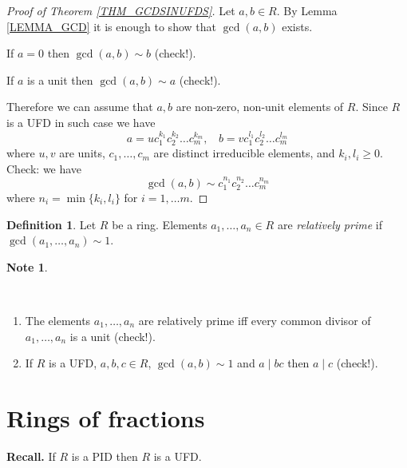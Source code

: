 \documentclass[12pt, letterpaper, oneside]{article}
\theoremstyle{plain}
\theoremstyle{definition}
\newtheorem{definition}[theorem]{Definition}
\newtheorem{note}[theorem]{Note}
\newcommand{\benu}{\begin{enumerate}}
\newcommand{\eenu}{\end{enumerate}}
\newcommand{\vs}{\vskip 5mm}
\begin{document}
 \begin{proof}[Proof of Theorem \ref{THM_GCDSINUFDS}]
Let $a, b\in R$. By Lemma  \ref{LEMMA_GCD} it is enough to show that $\gcd(a, b)$ exists.
 
 If $a= 0$ then $\gcd(a, b)\sim b$ (check!).  
 
 If $a$ is a unit then $\gcd(a, b) \sim a$ (check!).
  
 Therefore we can assume that  $a, b$ are non-zero, non-unit elements of $R$. 
 Since $R$ is a UFD in such case we have 
 $$a = uc_{1}^{k_{1}}c_{2}^{k_{2}}{\dots}c^{k_{m}}_{m}, \ \ \  \  
 b = vc_{1}^{l_{1}}c_{2}^{l_{2}}{\dots}c^{l_{m}}_{m}$$
 where $u, v$ are units, $c_{1}, \dots, c_{m}$ are distinct irreducible elements,  
 and $k_{i}, l_{i}\geq 0$. Check: we have
 $$\gcd(a, b) \sim c_{1}^{n_{1}}c_{2}^{n_{2}}{\dots}c_{m}^{n_{m}}$$
 where $n_{i} = \min\{k_{i}, l_{i}\}$ for $i=1, \dots m$. 
 \end{proof}
 
 
\vs\vs

\begin{definition}
Let $R$ be a ring. Elements $a_{1}, \dots, a_{n}\in R$ are \emph{relatively prime} if 
$\gcd(a_{1}, \dots, a_{n})\sim 1$.
\end{definition} 
 

 \vs\vs
 
 
 \begin{note}\ 
 \label{NOTE_RELPRIMES}
 
 \vskip -13mm
 
 \  
\benu
\item The elements $a_{1}, \dots, a_{n}$ are relatively prime iff every common divisor of 
 $a_{1}, \dots, a_{n}$ is a unit (check!). 
 \item If $R$ is a UFD,  $a, b, c\in R$, $\gcd(a, b)\sim  1$ and $a\mid bc$ then $a\mid c$
 (check!).
\eenu

 \end{note}
 
 





\newpage
\section{Rings of fractions}
\label{SEC_RINGSOFFRACTIONS}


\textbf{Recall.} If $R$ is a PID then $R$ is a UFD. 
\end{document}
